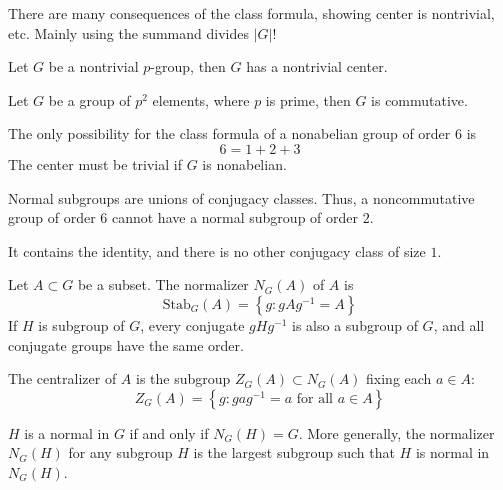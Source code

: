 \documentclass[openany]{book}
\begin{document}
\begin{warn}
    There are many consequences of the class formula, showing center is nontrivial, etc. Mainly using the summand divides $|G|$!
\end{warn}


\begin{thm}
    Let $G$ be a nontrivial $p$-group, then $G$ has a nontrivial center.
\end{thm}

\begin{prop}
    Let $G$ be a group of $p^2$ elements, where $p$ is prime, then $G$ is commutative.
\end{prop}

\begin{prop}
    The only possibility for the class formula of a nonabelian group of order $6$ is 
    \begin{equation*}
        6=1+2+3
    \end{equation*}
    The center must be trivial if $G$ is nonabelian.
\end{prop}


\begin{prop}
    Normal subgroups are unions of conjugacy classes. Thus, a noncommutative group of order $6$ cannot have a normal subgroup of order $2$.
\end{prop}
It contains the identity, and there is no other conjugacy class of size $1$.



\begin{defn}[normalizer]
    Let $A\subset G$ be a subset. The normalizer $N_G(A)$ of $A$ is 
    \begin{equation*}
        \text{Stab}_G(A)=\left\{g: gAg^{-1}=A\right\}
    \end{equation*}
    If $H$ is subgroup of $G$, every conjugate $gHg^{-1}$ is also a subgroup of $G$, and all conjugate groups have the same order.
\end{defn}
The centralizer of $A$ is the subgroup $Z_G(A)\subset N_G(A)$ fixing each $a\in A$:
    \begin{equation*}
        Z_G(A)=\left\{ g: gag^{-1}=a \text{ for all } a\in A\right\}
    \end{equation*}

\begin{prop}
    $H$ is a normal in $G$ if and only if $N_G(H)=G$. More generally, the normalizer $N_G(H)$ for any subgroup $H$ is the largest subgroup such that $H$ is normal in $N_G(H)$.
\end{prop}
\end{document}

